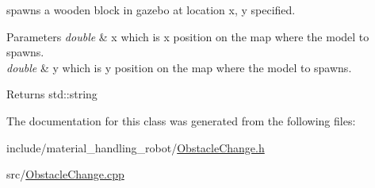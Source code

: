spawns a wooden block in gazebo at location x, y specified. 


\begin{DoxyParams}{Parameters}
{\em double} & x which is x position on the map where the model to spawns. \\
\hline
{\em double} & y which is y position on the map where the model to spawns. \\
\hline
\end{DoxyParams}
\begin{DoxyReturn}{Returns}
std\+::string 
\end{DoxyReturn}


The documentation for this class was generated from the following files\+:\begin{DoxyCompactItemize}
\item 
include/material\+\_\+handling\+\_\+robot/\hyperlink{ObstacleChange_8h}{Obstacle\+Change.\+h}\item 
src/\hyperlink{ObstacleChange_8cpp}{Obstacle\+Change.\+cpp}\end{DoxyCompactItemize}
